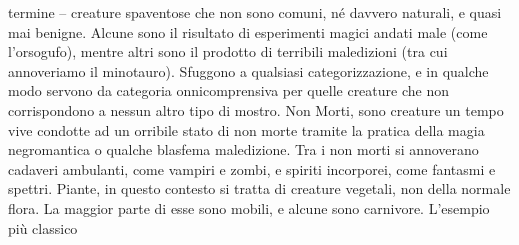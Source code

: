 \begin{multicols}{2}
termine – creature spaventose che non sono comuni,
né davvero naturali, e quasi mai benigne. Alcune sono
il risultato di esperimenti magici andati male (come
l’orsogufo), mentre altri sono il prodotto di terribili
maledizioni (tra cui annoveriamo il minotauro).
Sfuggono a qualsiasi categorizzazione, e in qualche
modo servono da categoria onnicomprensiva per quelle
creature che non corrispondono a nessun altro tipo di
mostro.
Non Morti, sono creature un tempo vive condotte ad un
orribile stato di non morte tramite la pratica della magia
negromantica o qualche blasfema maledizione. Tra i
non morti si annoverano cadaveri ambulanti, come
vampiri e zombi, e spiriti incorporei, come fantasmi e
spettri.
Piante, in questo contesto si tratta di creature vegetali,
non della normale flora. La maggior parte di esse sono
mobili, e alcune sono carnivore. L’esempio più classico 
 

\end{multicols}
